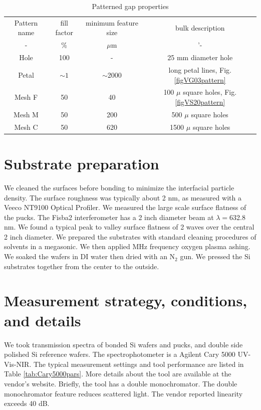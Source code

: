 \documentclass[osajnl,preprint,showpacs,superscriptaddress,12pt]{revtex4-1} %
\begin{document}
\begin{table}[h!]
\caption{Patterned gap properties \label{tabPatternFills}}
\begin{center}
    \begin{tabular}{ c c c c }
    \hline
    Pattern name & fill factor & minimum feature size & bulk description \\ 
    - & \% & $\mu$m & '- \\ 
    Hole & 100 & - & 25 mm diameter hole \\     
    Petal & $\sim1$ & $\sim$2000 & long petal lines, Fig. \ref{figVG03pattern} \\         
    Mesh F & 50 & 40 &  100 $\mu$ square holes, Fig. \ref{figVS20pattern}\\ 
    Mesh M & 50 & 200 &  500 $\mu$ square holes\\ 
    Mesh C & 50 & 620 &  1500 $\mu$ square holes\\     
        \hline
    \end{tabular}
\end{center}
\end{table}

\section{Substrate preparation}
We cleaned the surfaces before bonding to minimize the interfacial particle density.  The surface roughness was typically about 2 nm, as measured with a Veeco NT9100 Optical Profiler.  We measured the large scale surface flatness of the pucks.  The Fisba2 interferometer has a 2 inch diameter beam at $\lambda=$632.8 nm.  We found a typical peak to valley surface flatness of 2 waves over the central 2 inch diameter.  We prepared the substrates with standard cleaning procedures of solvents in a megasonic.  We then applied MHz frequency oxygen plasma ashing.  We soaked the wafers in DI water then dried with an N$_2$ gun.  We pressed the Si substrates together from the center to the outside.


\section{Measurement strategy, conditions, and details}
We took transmission spectra of bonded Si wafers and pucks, and double side polished Si reference wafers. The spectrophotometer is a Agilent Cary 5000 UV-Vis-NIR.  The typical measurement settings and tool performance are listed in Table \ref{tab:Cary5000pars}.  More details about the tool are available at the vendor's website.  Briefly, the tool has a double monochromator.  The double monochromator feature reduces scattered light.  The vendor reported linearity exceeds 40 dB.  
\end{document}
